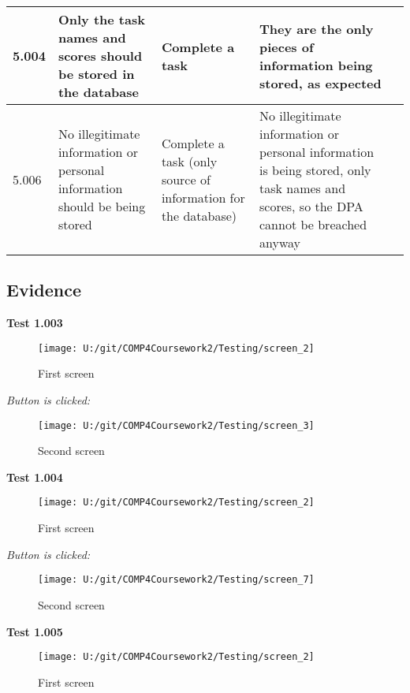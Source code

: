 \begin{landscape}
\begin{center}
\begin{longtable}{|p{2.5cm}|p{4cm}|p{4cm}|p{4.5cm}|p{3cm}|}
5.004 & Only the task names and scores should be stored in the database & Complete a task & They are the only pieces of information being stored, as expected & \\ \hline
5.006 & No illegitimate information or personal information should be being stored & Complete a task (only source of information for the database) & No illegitimate information or personal information is being stored, only task names and scores, so the DPA cannot be breached anyway & \\ \hline
\end{longtable}
\end{center}

\end{landscape}

\subsection{Evidence}

\textbf{Test 1.003}

\begin{figure}[H]
    \label{fig: First Screen}\caption{First screen}
    \texttt{[image: U:/git/COMP4Coursework2/Testing/screen\_2]}
\end{figure}

\textit{Button is clicked: }

\begin{figure}[H]
    \label{fig: Second Screen}\caption{Second screen}
    \texttt{[image: U:/git/COMP4Coursework2/Testing/screen\_3]}
\end{figure}

\textbf{Test 1.004}

\begin{figure}[H]
    \label{fig: First Screen}\caption{First screen}
    \texttt{[image: U:/git/COMP4Coursework2/Testing/screen\_2]}
\end{figure}

\textit{Button is clicked: }

\begin{figure}[H]
    \label{fig: Second Screen}\caption{Second screen}
    \texttt{[image: U:/git/COMP4Coursework2/Testing/screen\_7]}
\end{figure}

\textbf{Test 1.005}

\begin{figure}[H]
    \label{fig: First Screen}\caption{First screen}
    \texttt{[image: U:/git/COMP4Coursework2/Testing/screen\_2]}
\end{figure}

